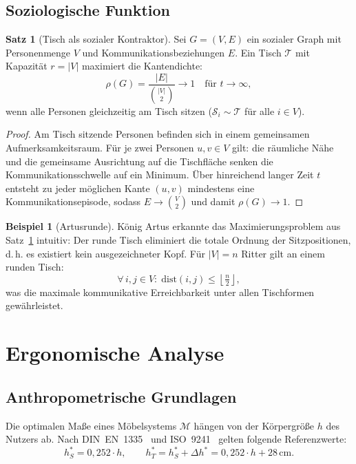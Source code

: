 ﻿\documentclass[a4paper,12pt]{article}
\theoremstyle{definition}
\newtheorem{beispiel}{Beispiel}
\newtheorem{satz}{Satz}
\begin{document}
\subsection{Soziologische Funktion}

\begin{satz}[Tisch als sozialer Kontraktor]
\label{satz:sozial}
	Sei $G = (V, E)$ ein sozialer Graph mit Personenmenge $V$ und Kommunikationsbeziehungen
	$E$. Ein Tisch $\mathcal{T}$ mit Kapazit\"{a}t $r = |V|$ maximiert die Kantendichte:
	\[
		\rho(G) = \frac{|E|}{\binom{|V|}{2}} \to 1 \quad \text{f\"{u}r } t \to \infty,
	\]
	wenn alle Personen gleichzeitig am Tisch sitzen ($\mathcal{S}_i \sim \mathcal{T}$
	f\"{u}r alle $i \in V$).
\end{satz}

\begin{proof}
	Am Tisch sitzende Personen befinden sich in einem gemeinsamen Aufmerksamkeitsraum.
	F\"{u}r je zwei Personen $u, v \in V$ gilt: die r\"{a}umliche N\"{a}he und die gemeinsame
	Ausrichtung auf die Tischfl\"{a}che senken die Kommunikationsschwelle auf ein Minimum.
	\"{U}ber hinreichend langer Zeit $t$ entsteht zu jeder m\"{o}glichen Kante $(u,v)$
	mindestens eine Kommunikationsepisode, sodass $E \to \binom{V}{2}$ und damit
	$\rho(G) \to 1$.
\end{proof}

\begin{beispiel}[Artusrunde]
	K\"{o}nig Artus erkannte das Maximierungsproblem aus Satz~\ref{satz:sozial} intuitiv:
	Der runde Tisch eliminiert die totale Ordnung der Sitzpositionen, d.\,h. es existiert
	kein ausgezeichneter Kopf. F\"{u}r $|V| = n$ Ritter gilt an einem runden Tisch:
	\[
		\forall\, i, j \in V\colon\; \mathrm{dist}(i, j) \leq \left\lfloor \tfrac{n}{2} \right\rfloor,
	\]
	was die maximale kommunikative Erreichbarkeit unter allen Tischformen gew\"{a}hrleistet.
\end{beispiel}

\section{Ergonomische Analyse}

\subsection{Anthropometrische Grundlagen}

Die optimalen Ma\ss{}e eines M\"{o}belsystems $\mathcal{M}$ h\"{a}ngen von der K\"{o}rpergr\"{o}\ss{}e $h$ des
Nutzers ab. Nach DIN~EN~1335~\cite{DINEN1335} und ISO~9241~\cite{ISO9241} gelten folgende Referenzwerte:
\[
	h_S^* = 0{,}252 \cdot h, \qquad
	h_T^* = h_S^* + \Delta h^* = 0{,}252 \cdot h + 28\,\mathrm{cm}.
\]
\end{document}
